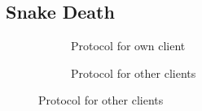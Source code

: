 \subsection{Snake Death}

\begin{figure}[H]
    \centering
    \begin{subfigure}{.48\linewidth}
        \centering
        
        \caption{Protocol for own client}
    \end{subfigure}
    \begin{subfigure}{.48\linewidth}
        \centering
        
        \caption{Protocol for other clients}
    \end{subfigure}
\end{figure}

\vspace{1.5em}

\begin{figure}[H]

\end{figure}

\vspace{1.5em}

\begin{figure}[H]

\end{figure}
